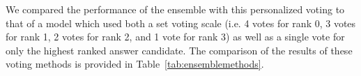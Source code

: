 We compared the performance of the ensemble with this personalized voting to that of a model which used both a set voting scale (i.e. 4 votes for rank 0, 3 votes for rank 1, 2 votes for rank 2, and 1 vote for rank 3) as well as a single vote for only the highest ranked answer candidate.  The comparison of the results of these voting methods is provided in Table~\ref{tab:ensemblemethods}.